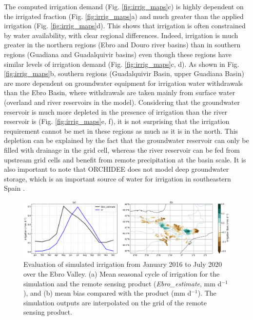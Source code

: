 The computed irrigation demand (Fig. \ref{fig:irrig_maps}c) is highly dependent on the irrigated fraction (Fig. \ref{fig:irrig_maps}a) and much greater than the applied irrigation (Fig. \ref{fig:irrig_maps}d). This shows that irrigation is often constrained by water availability, with clear regional differences. Indeed, irrigation is much greater in the northern regions (Ebro and Douro river basins) than in southern regions (Guadiana and Guadalquivir basins) even though these regions have similar levels of irrigation demand (Fig. \ref{fig:irrig_maps}c, d).
As shown in Fig. \ref{fig:irrig_maps}b, southern regions (Guadalquivir Basin, upper Guadiana Basin) are more dependent on groundwater equipment for irrigation water withdrawals than the Ebro Basin, where withdrawals are taken mainly from surface water (overland and river reservoirs in the model).
Considering that the groundwater reservoir is much more depleted in the presence of irrigation than the river reservoir is (Fig. \ref{fig:irrig_maps}e, f), it is not surprising that the irrigation requirement cannot be met in these regions as much as it is in the north.
This depletion can be explained by the fact that the groundwater reservoir can only be filled with drainage in the grid cell, whereas the river reservoir can be fed from upstream grid cells and benefit from remote precipitation at the basin scale. It is also important to note that ORCHIDEE does not model deep groundwater storage, which is an important source of water for irrigation in southeastern Spain \citep{custodio_groundwater_2016}.

\begin{figure}[htbp]
    \centering
    \includegraphics[width=\textwidth]{images/chap4/article/f04_horizontalized.png}
    \caption{Evaluation of simulated irrigation from January 2016 to July 2020 over the Ebro Valley. (a) Mean seasonal cycle of irrigation for the \irr simulation and the remote sensing product (\textit{Ebro\_estimate}, mm d$^{-1}$), and (b) mean bias compared with the product (mm d$^{-1}$). The simulation outputs are interpolated on the grid of the remote sensing product.}
    \label{fig:irrig_eval}
\end{figure}


